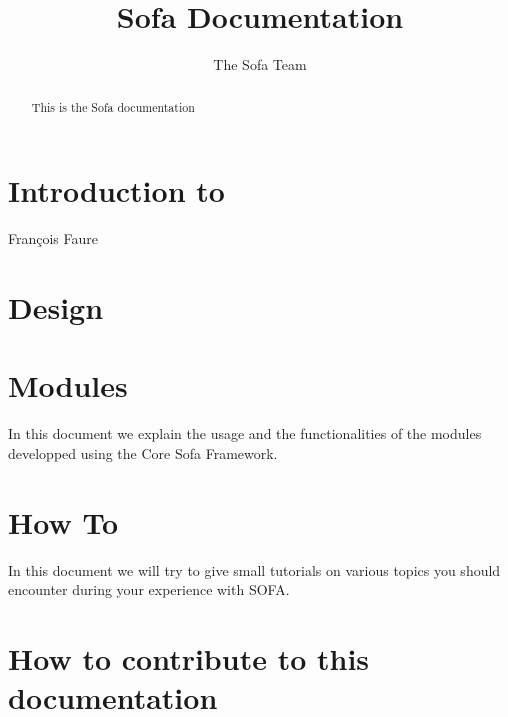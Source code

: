 \documentclass[a4paper,10pt]{report}
\title{Sofa Documentation}
\author{The Sofa Team}
\begin{document}
\maketitle

\begin{abstract}
This is the Sofa documentation
\end{abstract}

\tableofcontents

\chapter{Introduction to \sofa}
Fran\c{c}ois Faure

\graphicspath{{../introduction/}}  %


\chapter{Design}
\graphicspath{{../design/}}  %

\newpage



\chapter{Modules}
\graphicspath{{../modules/}}  %
In this document we explain the usage and the functionalities of the modules developped using the Core Sofa Framework.


\chapter{How To}
\graphicspath{{../HowTo/}}  %
In this document we will try to give small tutorials on various topics you should encounter during your experience with SOFA.




\chapter{How to contribute to this documentation}
\end{document}
